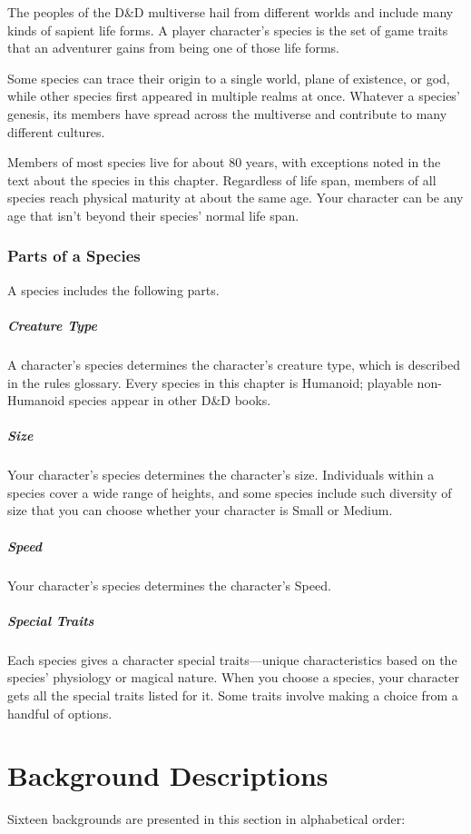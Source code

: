 \documentclass[10pt,a4paper,twoside,bg=print,twocolumn,openany,nodeprecatedcode]{dndbook}
\begin{document}
The peoples of the D\&D multiverse hail from different worlds and include many kinds of sapient life forms. A player character's species is the set of game traits that an adventurer gains from being one of those life forms.

Some species can trace their origin to a single world, plane of existence, or god, while other species first appeared in multiple realms at once. Whatever a species' genesis, its members have spread across the multiverse and contribute to many different cultures.

Members of most species live for about 80 years, with exceptions noted in the text about the species in this chapter. Regardless of life span, members of all species reach physical maturity at about the same age. Your character can be any age that isn't beyond their species' normal life span.

\subsubsection{Parts of a Species}
A species includes the following parts.

\subparagraph{Creature Type}
A character's species determines the character's creature type, which is described in the rules glossary. Every species in this chapter is Humanoid; playable non-Humanoid species appear in other D\&D books.

\subparagraph{Size}
Your character's species determines the character's size. Individuals within a species cover a wide range of heights, and some species include such diversity of size that you can choose whether your character is Small or Medium.

\subparagraph{Speed}
Your character's species determines the character's Speed.

\subparagraph{Special Traits}
Each species gives a character special traits—unique characteristics based on the species' physiology or magical nature. When you choose a species, your character gets all the special traits listed for it. Some traits involve making a choice from a handful of options.

\section{Background Descriptions}
Sixteen backgrounds are presented in this section in alphabetical order:
\end{document}
